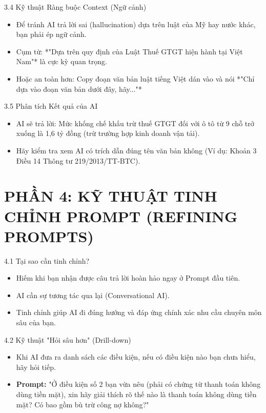 \documentclass[aspectratio=169]{beamer}
\begin{document}
\begin{frame}{3.4 Kỹ thuật Ràng buộc Context (Ngữ cảnh)}
    \begin{itemize}
        \item Để tránh AI trả lời sai (hallucination) dựa trên luật của Mỹ hay nước khác, bạn phải ép ngữ cảnh.
        \item Cụm từ: *"Dựa trên quy định của Luật Thuế GTGT hiện hành tại Việt Nam"* là cực kỳ quan trọng.
        \item Hoặc an toàn hơn: Copy đoạn văn bản luật tiếng Việt dán vào và nói *"Chỉ dựa vào đoạn văn bản dưới đây, hãy..."*
    \end{itemize}
\end{frame}


\begin{frame}{3.5 Phân tích Kết quả của AI}
    \begin{itemize}
        \item AI sẽ trả lời: Mức khống chế khấu trừ thuế GTGT đối với ô tô từ 9 chỗ trở xuống là 1,6 tỷ đồng (trừ trường hợp kinh doanh vận tải).
        \item Hãy kiểm tra xem AI có trích dẫn đúng tên văn bản không (Ví dụ: Khoản 3 Điều 14 Thông tư 219/2013/TT-BTC).
    \end{itemize}
\end{frame}


\section{PHẦN 4: KỸ THUẬT TINH CHỈNH PROMPT (REFINING PROMPTS)}


\begin{frame}{4.1 Tại sao cần tinh chỉnh?}
    \begin{itemize}
        \item Hiếm khi bạn nhận được câu trả lời hoàn hảo ngay ở Prompt đầu tiên.
        \item AI cần sự tương tác qua lại (Conversational AI).
        \item Tinh chỉnh giúp AI đi đúng hướng và đáp ứng chính xác nhu cầu chuyên môn sâu của bạn.
    \end{itemize}
\end{frame}


\begin{frame}{4.2 Kỹ thuật "Hỏi sâu hơn" (Drill-down)}
    \begin{itemize}
        \item Khi AI đưa ra danh sách các điều kiện, nếu có điều kiện nào bạn chưa hiểu, hãy hỏi tiếp.
        \item \textbf{Prompt:} "Ở điều kiện số 2 bạn vừa nêu (phải có chứng từ thanh toán không dùng tiền mặt), xin hãy giải thích rõ thế nào là thanh toán không dùng tiền mặt? Có bao gồm bù trừ công nợ không?"
    \end{itemize}
\end{frame}
\end{document}
